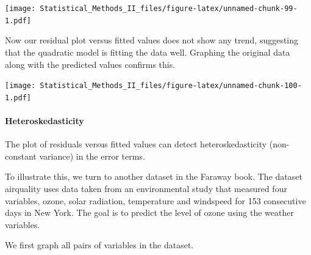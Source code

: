 \documentclass[]{book}
\newenvironment{Shaded}{\begin{snugshade}}{\end{snugshade}}
\newcommand{\KeywordTok}[1]{\textcolor[rgb]{0.13,0.29,0.53}{\textbf{{#1}}}}
\newcommand{\DataTypeTok}[1]{\textcolor[rgb]{0.13,0.29,0.53}{{#1}}}
\newcommand{\DecValTok}[1]{\textcolor[rgb]{0.00,0.00,0.81}{{#1}}}
\newcommand{\StringTok}[1]{\textcolor[rgb]{0.31,0.60,0.02}{{#1}}}
\newcommand{\CommentTok}[1]{\textcolor[rgb]{0.56,0.35,0.01}{\textit{{#1}}}}
\newcommand{\NormalTok}[1]{{#1}}
\let\oldparagraph\paragraph
\renewcommand{\paragraph}[1]{\oldparagraph{#1}\mbox{}}
\theoremstyle{definition}
\theoremstyle{definition}
\theoremstyle{remark}
\begin{document}
\texttt{[image: Statistical\_Methods\_II\_files/figure-latex/unnamed-chunk-99-1.pdf]}

Now our residual plot versus fitted values does not show any trend,
suggesting that the quadratic model is fitting the data well. Graphing
the original data along with the predicted values confirms this.

\begin{Shaded}
\end{Shaded}

\texttt{[image: Statistical\_Methods\_II\_files/figure-latex/unnamed-chunk-100-1.pdf]}

\paragraph{Heteroskedasticity}\label{heteroskedasticity}

The plot of residuals versus fitted values can detect heteroskedasticity
(non-constant variance) in the error terms.

To illustrate this, we turn to another dataset in the Faraway book. The
dataset airquality uses data taken from an environmental study that
measured four variables, ozone, solar radiation, temperature and
windspeed for 153 consecutive days in New York. The goal is to predict
the level of ozone using the weather variables.

We first graph all pairs of variables in the dataset.
\end{document}
